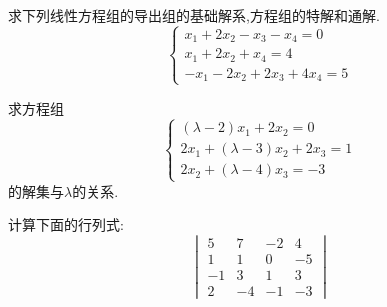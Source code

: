 \documentclass{ctexart}
\begin{document}
\pagestyle{empty}
\begin{center}
\end{center}
\begin{homework}[1]
    求下列线性方程组的导出组的基础解系,方程组的特解和通解.
    \[\left\{\begin{array}{l}
        x_1+2x_2-x_3-x_4=0\\
        x_1+2x_2+x_4=4\\
        -x_1-2x_2+2x_3+4x_4=5
    \end{array}\right.\]
\end{homework}
\begin{homework}[2]
    求方程组
    \[\left\{\begin{array}{l}
        (\lambda-2)x_1+2x_2=0\\
        2x_1+(\lambda-3)x_2+2x_3=1\\
        2x_2+(\lambda-4)x_3=-3
    \end{array}\right.\]
    的解集与$\lambda$的关系.
\end{homework}
\begin{homework}[3]
    计算下面的行列式:
    \[\begin{vmatrix}
        5&7&-2&4\\
        1&1&0&-5\\
        -1&3&1&3\\
        2&-4&-1&-3
    \end{vmatrix}\]
\end{homework}
\end{document}
